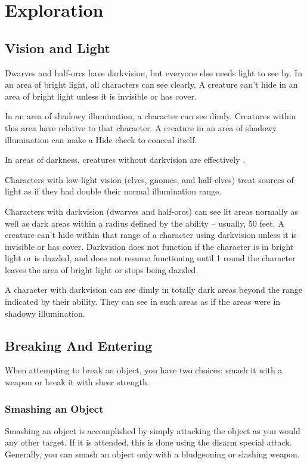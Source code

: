 \section{Exploration}
\subsection{Vision and Light}
Dwarves and half-orcs have darkvision, but everyone else needs light to see by.  In an area of bright light, all characters can see clearly. A creature can't hide in an area of bright light unless it is invisible or has cover.

In an area of shadowy illumination, a character can see dimly. Creatures within this area have \concealment relative to that character. A creature in an area of shadowy illumination can make a Hide check to conceal itself.

In areas of darkness, creatures without darkvision are effectively \blinded.

Characters with low-light vision (elves, gnomes, and half-elves) treat sources of light as if they had double their normal illumination range.

Characters with darkvision (dwarves and half-orcs) can see lit areas normally as well as dark areas within a radius defined by the ability -- usually, 50 feet. A creature can't hide within that range of a character using darkvision unless it is invisible or has cover. Darkvision does not function if the character is in bright light or is dazzled, and does not resume functioning until 1 round the character leaves the area of bright light or stops being dazzled.

A character with darkvision can see dimly in totally dark areas beyond the range indicated by their ability. They can see in such areas as if the areas were in shadowy illumination.

\subsection{Breaking And Entering}
When attempting to break an object, you have two choices: smash it with a weapon or break it with sheer strength.

\subsubsection{Smashing an Object}
Smashing an object is accomplished by simply attacking the object as you would any other target. If it is attended, this is done using the disarm special attack. Generally, you can smash an object only with a bludgeoning or slashing weapon.

